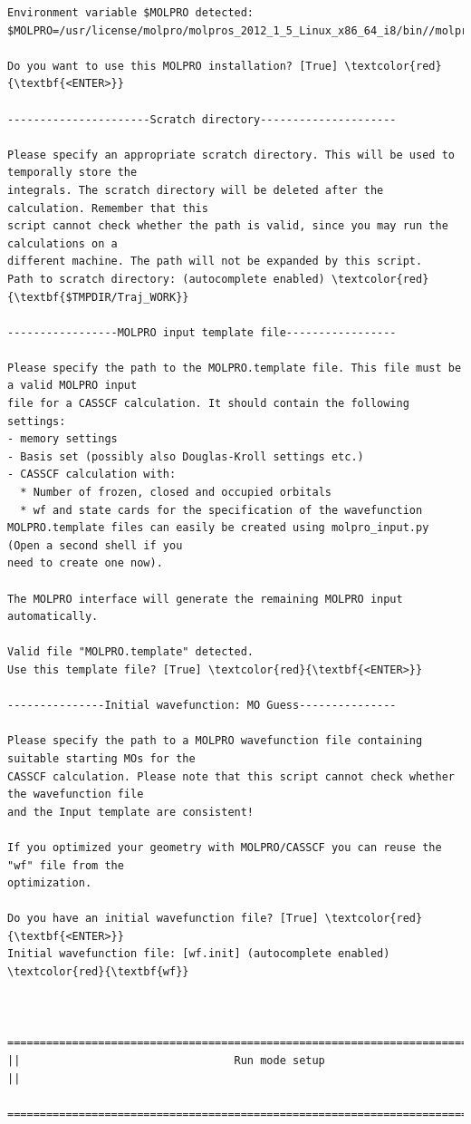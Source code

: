 \documentclass[a4paper,11pt,DIV=15,openany]{scrbook}
\begin{document}
\begin{oframed}
\begin{Verbatim}[commandchars=\\\{\}]
Environment variable $MOLPRO detected:
$MOLPRO=/usr/license/molpro/molpros_2012_1_5_Linux_x86_64_i8/bin//molpro

Do you want to use this MOLPRO installation? [True] \textcolor{red}{\textbf{<ENTER>}}

----------------------Scratch directory---------------------

Please specify an appropriate scratch directory. This will be used to temporally store the 
integrals. The scratch directory will be deleted after the calculation. Remember that this 
script cannot check whether the path is valid, since you may run the calculations on a 
different machine. The path will not be expanded by this script.
Path to scratch directory: (autocomplete enabled) \textcolor{red}{\textbf{$TMPDIR/Traj_WORK}}

-----------------MOLPRO input template file-----------------

Please specify the path to the MOLPRO.template file. This file must be a valid MOLPRO input 
file for a CASSCF calculation. It should contain the following settings:
- memory settings
- Basis set (possibly also Douglas-Kroll settings etc.)
- CASSCF calculation with:
  * Number of frozen, closed and occupied orbitals
  * wf and state cards for the specification of the wavefunction
MOLPRO.template files can easily be created using molpro_input.py (Open a second shell if you 
need to create one now).

The MOLPRO interface will generate the remaining MOLPRO input automatically.

Valid file "MOLPRO.template" detected. 
Use this template file? [True] \textcolor{red}{\textbf{<ENTER>}}

---------------Initial wavefunction: MO Guess---------------

Please specify the path to a MOLPRO wavefunction file containing suitable starting MOs for the 
CASSCF calculation. Please note that this script cannot check whether the wavefunction file 
and the Input template are consistent!

If you optimized your geometry with MOLPRO/CASSCF you can reuse the "wf" file from the 
optimization.

Do you have an initial wavefunction file? [True] \textcolor{red}{\textbf{<ENTER>}}
Initial wavefunction file: [wf.init] (autocomplete enabled) \textcolor{red}{\textbf{wf}}


  ================================================================================
||                                 Run mode setup                                 ||
  ================================================================================



\end{Verbatim}
\end{oframed}
\end{document}
